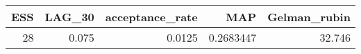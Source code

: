 \begin{longtable}{rrrrr}
\toprule
ESS & LAG\_30 & acceptance\_rate & MAP & Gelman\_rubin \\ 
\midrule
28 & 0.075 & 0.0125 & 0.2683447 & 32.746 \\ 
\bottomrule
\end{longtable}


